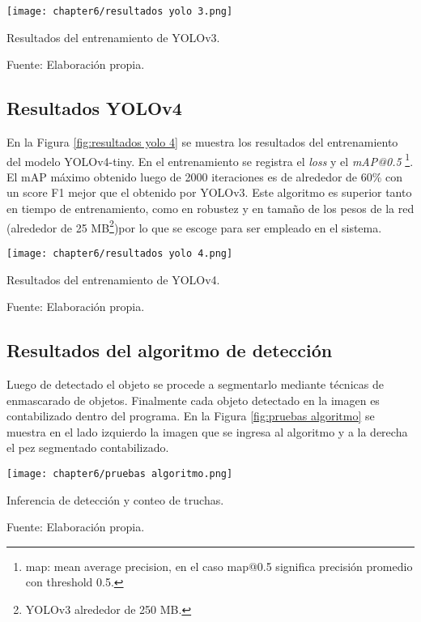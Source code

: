 \begin{myfigure}[H]
	\footnotesize\centering
	\texttt{[image: chapter6/resultados yolo 3.png]}
	\caption{Resultados del entrenamiento de YOLOv3.}
	\begin{myflushcenter}
		Fuente: Elaboración propia.
	\end{myflushcenter}
	\label{fig:resultados yolo 3}
\end{myfigure}

\subsection{Resultados YOLOv4}

En la Figura \ref{fig:resultados yolo 4} se muestra los resultados del entrenamiento del modelo YOLOv4-tiny. En el entrenamiento se registra el \textit{loss} y el \textit{mAP@0.5} \footnote{map: mean average precision, en el caso map@0.5 significa precisión promedio con threshold 0.5.}. El mAP máximo obtenido luego de 2000 iteraciones es de alrededor de 60\% con un score F1 mejor que el obtenido por YOLOv3. Este algoritmo es superior tanto en tiempo de entrenamiento, como en robustez y en tamaño de los pesos de la red (alrededor de 25 MB\footnote{YOLOv3 alrededor de 250 MB.})por lo que se escoge para ser empleado en el sistema.

\begin{myfigure}[H]
	\footnotesize\centering
	\texttt{[image: chapter6/resultados yolo 4.png]}
	\caption{Resultados del entrenamiento de YOLOv4.}
	\begin{myflushcenter}
		Fuente: Elaboración propia.
	\end{myflushcenter}
	\label{fig:resultados yolo 4}
\end{myfigure}


\subsection{Resultados del algoritmo de detección}

Luego de detectado el objeto se procede a segmentarlo mediante técnicas de enmascarado de objetos. Finalmente cada objeto detectado en la imagen es contabilizado dentro del programa. En la Figura \ref{fig:pruebas algoritmo} se muestra en el lado izquierdo la imagen que se ingresa al algoritmo y a la derecha el pez segmentado contabilizado.

\begin{myfigure}[H]
	\footnotesize\centering
	\texttt{[image: chapter6/pruebas algoritmo.png]}
	\caption{Inferencia de detección y conteo de truchas.}
	\begin{myflushcenter}
		Fuente: Elaboración propia.
	\end{myflushcenter}
	\label{fig:pruebas algoritmo}
\end{myfigure}

